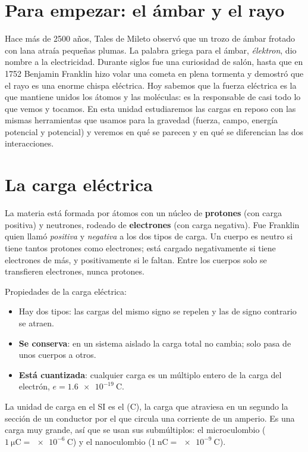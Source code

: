 
\section*{Para empezar: el ámbar y el rayo}

Hace más de 2500 años, Tales de Mileto observó que un trozo de ámbar frotado con lana atraía pequeñas plumas. La palabra
griega para el ámbar, \emph{élektron}, dio nombre a la electricidad. Durante siglos fue una curiosidad de salón, hasta que en
1752 Benjamin Franklin hizo volar una cometa en plena tormenta y demostró que el rayo es una enorme chispa eléctrica. Hoy
sabemos que la fuerza eléctrica es la que mantiene unidos los átomos y las moléculas: es la responsable de casi todo lo que
vemos y tocamos. En esta unidad estudiaremos las cargas en reposo con las mismas herramientas que usamos para la gravedad
(fuerza, campo, energía potencial y potencial) y veremos en qué se parecen y en qué se diferencian las dos interacciones.

\section{La carga eléctrica}\label{sec:ele-carga}

La materia está formada por átomos con un núcleo de \textbf{protones} (con carga positiva) y neutrones, rodeado de
\textbf{electrones} (con carga negativa). Fue Franklin quien llamó \emph{positiva} y \emph{negativa} a los dos tipos de carga.
Un cuerpo es neutro si tiene tantos protones como electrones; está cargado negativamente si tiene electrones de más, y
positivamente si le faltan. Entre los cuerpos solo se transfieren electrones, nunca protones.

Propiedades de la carga eléctrica:
\begin{itemize}
    \item Hay dos tipos: las cargas del mismo signo se repelen y las de signo contrario se atraen.
    \item \textbf{Se conserva}: en un sistema aislado la carga total no cambia; solo pasa de unos cuerpos a otros.
    \item \textbf{Está cuantizada}: cualquier carga es un múltiplo entero de la carga del electrón,
    \(e = \qty{1.6e-19}{\coulomb}\).
\end{itemize}
La unidad de carga en el SI es el  (\unit{\coulomb}), la carga que atraviesa en un segundo la sección de un
conductor por el que circula una corriente de un amperio. Es una carga muy grande, así que se usan sus submúltiplos: el
microculombio (\(\qty{1}{\micro\coulomb} = \qty{e-6}{\coulomb}\)) y el nanoculombio (\(\qty{1}{\nano\coulomb} = \qty{e-9}{\coulomb}\)).

